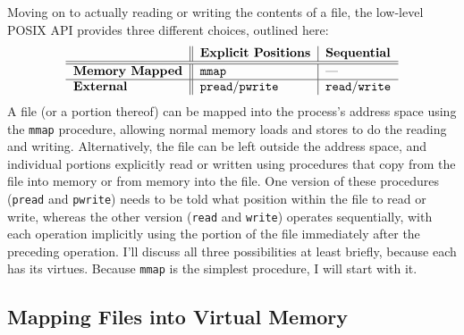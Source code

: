 Moving on to actually reading or
writing the contents of a file, the low-level POSIX API provides three
different choices, outlined here:
\[\label{file-access-styles-table}\begin{tabular}{l||l|l}
&\bf Explicit Positions&\bf Sequential\\\hline\hline
\bf Memory Mapped&\texttt{mmap}&---\\\hline
\bf External&\texttt{pread}/\texttt{pwrite}&\texttt{read}/\texttt{write}
\end{tabular}\]
A file (or a portion thereof) can be mapped into
the process's address space using the \verb|mmap| procedure, allowing
normal memory loads and stores to do the reading and writing.  Alternatively, the
file can be left outside the address space, and individual portions
explicitly read or written using procedures that copy from the file
into memory or from memory into the file.  One version of these
procedures (\verb|pread| and \verb|pwrite|) needs to be told what
position within the file to read or write, whereas the other version
(\verb|read| and \verb|write|) operates sequentially, with each
operation implicitly using the portion of the file immediately after
the preceding operation.  I'll discuss all three possibilities at
least briefly, because each has its virtues.  Because \verb|mmap| is the
simplest procedure, I will start with it.

\subsection{Mapping Files into Virtual Memory}

